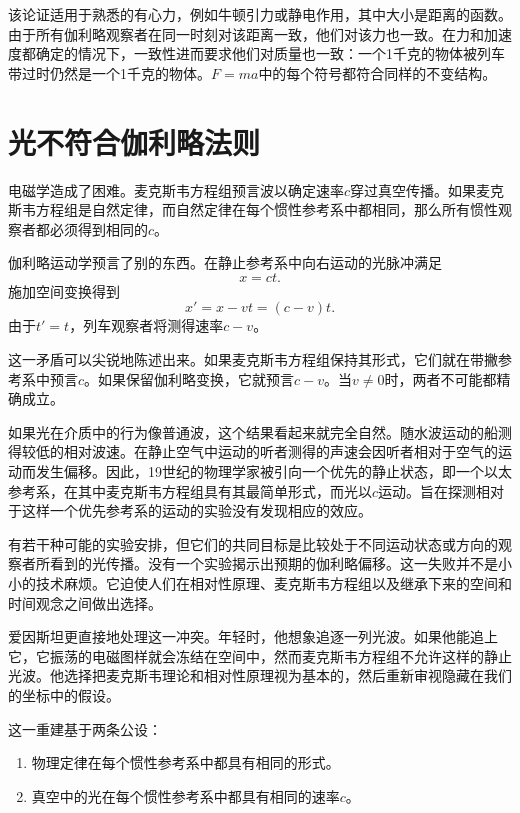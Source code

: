该论证适用于熟悉的有心力，例如牛顿引力或静电作用，其中大小是距离的函数。由于所有伽利略观察者在同一时刻对该距离一致，他们对该力也一致。在力和加速度都确定的情况下，一致性进而要求他们对质量也一致：一个1千克的物体被列车带过时仍然是一个1千克的物体。\(F=ma\)中的每个符号都符合同样的不变结构。

\section{光不符合伽利略法则}

电磁学造成了困难。麦克斯韦方程组预言波以确定速率\(c\)穿过真空传播。如果麦克斯韦方程组是自然定律，而自然定律在每个惯性参考系中都相同，那么所有惯性观察者都必须得到相同的\(c\)。

伽利略运动学预言了别的东西。在静止参考系中向右运动的光脉冲满足
\begin{equation}
x=ct.
\end{equation}
施加空间变换得到
\begin{equation}
x'=x-vt=(c-v)t.
\end{equation}
由于\(t'=t\)，列车观察者将测得速率\(c-v\)。

这一矛盾可以尖锐地陈述出来。如果麦克斯韦方程组保持其形式，它们就在带撇参考系中预言\(c\)。如果保留伽利略变换，它就预言\(c-v\)。当\(v\ne0\)时，两者不可能都精确成立。

如果光在介质中的行为像普通波，这个结果看起来就完全自然。随水波运动的船测得较低的相对波速。在静止空气中运动的听者测得的声速会因听者相对于空气的运动而发生偏移。因此，19世纪的物理学家被引向一个优先的静止状态，即一个以太参考系，在其中麦克斯韦方程组具有其最简单形式，而光以\(c\)运动。旨在探测相对于这样一个优先参考系的运动的实验没有发现相应的效应。

有若干种可能的实验安排，但它们的共同目标是比较处于不同运动状态或方向的观察者所看到的光传播。没有一个实验揭示出预期的伽利略偏移。这一失败并不是小小的技术麻烦。它迫使人们在相对性原理、麦克斯韦方程组以及继承下来的空间和时间观念之间做出选择。

爱因斯坦更直接地处理这一冲突。年轻时，他想象追逐一列光波。如果他能追上它，它振荡的电磁图样就会冻结在空间中，然而麦克斯韦方程组不允许这样的静止光波。他选择把麦克斯韦理论和相对性原理视为基本的，然后重新审视隐藏在我们的坐标中的假设。

这一重建基于两条公设：
\begin{enumerate}
\item 物理定律在每个惯性参考系中都具有相同的形式。
\item 真空中的光在每个惯性参考系中都具有相同的速率\(c\)。
\end{enumerate}


